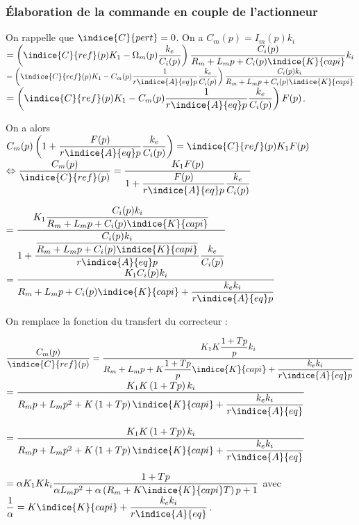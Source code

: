 \subsubsection{Élaboration de la commande en couple de l'actionneur}

\ifprof\begin{corrige}
On rappelle que $\indice{C}{pert} = 0$.	
On a $C_m(p) = I_m(p) k_i $ 
$=\left(\indice{C}{ref}(p)K_1- \Omega_m(p) \dfrac{k_e}{C_i(p)}\right) \dfrac{C_i(p)}{R_m + L_mp + C_i(p)\indice{K}{capi}}   k_i $ 
$=\left(\indice{C}{ref}(p)K_1- C_m(p) \dfrac{1}{r\indice{A}{eq}p}\dfrac{k_e}{C_i(p)}\right) \dfrac{C_i(p) k_i}{R_m + L_mp + C_i(p)\indice{K}{capi}} $
$=\left(\indice{C}{ref}(p)K_1- C_m(p) \dfrac{1}{r\indice{A}{eq}p}\dfrac{k_e}{C_i(p)}\right) F(p) $. 

On a alors 
$C_m(p) \left(1+\dfrac{F(p)}{r\indice{A}{eq}p}\dfrac{k_e}{C_i(p)}\right)=\indice{C}{ref}(p)K_1 F(p)$
$ \Leftrightarrow \dfrac{C_m(p) }{\indice{C}{ref}(p)} =\dfrac{K_1 F(p)}{1+\dfrac{F(p)}{r\indice{A}{eq}p}\dfrac{k_e}{C_i(p)}} $

$=\dfrac{K_1 \dfrac{C_i(p) k_i}{R_m + L_mp + C_i(p)\indice{K}{capi}}}{1+\dfrac{\dfrac{C_i(p) k_i}{R_m + L_mp + C_i(p)\indice{K}{capi}}}{r\indice{A}{eq}p}\dfrac{k_e}{C_i(p)}} $
$=\dfrac{K_1 C_i(p) k_i}{R_m + L_mp + C_i(p)\indice{K}{capi}+\dfrac{k_e k_i}{r\indice{A}{eq}p}} $

On remplace la fonction du transfert du correcteur :

$\dfrac{C_m(p) }{\indice{C}{ref}(p)}=\dfrac{K_1 K\dfrac{1+Tp}{p} k_i}{R_m + L_mp + K\dfrac{1+Tp}{p}\indice{K}{capi}+\dfrac{k_e k_i}{r\indice{A}{eq}p}} $
$=\dfrac{K_1 K\left(1+Tp\right) k_i}{R_mp + L_mp^2 + K\left(1+Tp\right)\indice{K}{capi}+\dfrac{k_e k_i}{r\indice{A}{eq}}} $

$=\dfrac{K_1 K\left(1+Tp\right) k_i}{R_mp + L_mp^2 + K\left(1+Tp\right)\indice{K}{capi}+\dfrac{k_e k_i}{r\indice{A}{eq}}} $


$=\alpha K_1 Kk_i \dfrac{1+Tp }{\alpha L_mp^2 + \alpha\left(R_m+  K\indice{K}{capi}T\right) p+1} $ avec $\dfrac{1}{\alpha} = K\indice{K}{capi}+\dfrac{k_e k_i}{r\indice{A}{eq}}$.


\end{corrige}
